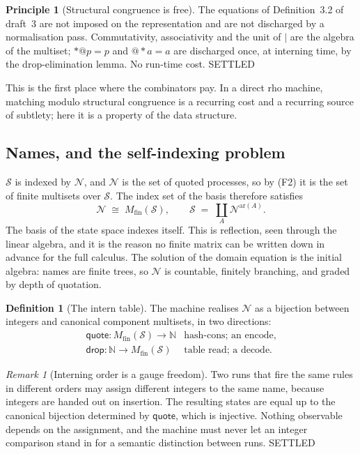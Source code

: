 \documentclass[11pt,a4paper]{article}
\makeatletter
\theoremstyle{plain}
\theoremstyle{definition}
\newtheorem{definition}[theorem]{Definition}
\newtheorem{principle}[theorem]{Principle}
\theoremstyle{remark}
\newtheorem{remark}[theorem]{Remark}
\newcommand{\rhoc}{\textsf{rho}}
\newcommand{\quo}[1]{@#1}
\newcommand{\drp}[1]{{*}#1}
\newcommand{\Spec}{\mathcal{S}}
\newcommand{\Nm}{\mathcal{N}}
\makeatother
\begin{document}
\begin{principle}[Structural congruence is free]
\label{prin:free}
The equations of Definition~3.2 of draft~3 are not imposed on the
representation and are not discharged by a normalisation pass. Commutativity,
associativity and the unit of $\mid$ are the algebra of the multiset;
$\drp{\quo{p}} = p$ and $\quo{\drp{a}} = a$ are discharged once, at
interning time, by the drop-elimination lemma. No run-time cost. \textsf{SETTLED}
\end{principle}

This is the first place where the combinators pay. In a direct \rhoc{}
machine, matching modulo structural congruence is a recurring cost and a
recurring source of subtlety; here it is a property of the data structure.

\subsection{Names, and the self-indexing problem}

$\Spec$ is indexed by $\Nm$, and $\Nm$ is the set of quoted processes, so by
(F2) it is the set of finite multisets over $\Spec$. The index set of the
basis therefore satisfies
\[
  \Nm \;\cong\; M_{\mathrm{fin}}(\Spec), \qquad
  \Spec \;=\; \textstyle\coprod_{A} \Nm^{\mathrm{ar}(A)} .
\]
The basis of the state space indexes itself. This is reflection, seen through
the linear algebra, and it is the reason no finite matrix can be written down
in advance for the full calculus. The solution of the domain equation is the
initial algebra: names are finite trees, so $\Nm$ is countable, finitely
branching, and graded by depth of quotation.

\begin{definition}[The intern table]
\label{def:intern}
The machine realises $\Nm$ as a bijection between integers and canonical
component multisets, in two directions:
\[
\begin{array}{ll}
  \mathsf{quote} : M_{\mathrm{fin}}(\Spec) \to \mathbb{N}
    & \text{hash-cons; an encode,}\\[2pt]
  \mathsf{drop} : \mathbb{N} \to M_{\mathrm{fin}}(\Spec)
    & \text{table read; a decode.}
\end{array}
\]
\end{definition}

\begin{remark}[Interning order is a gauge freedom]
\label{rem:gauge}
Two runs that fire the same rules in different orders may assign different
integers to the same name, because integers are handed out on insertion. The
resulting states are equal up to the canonical bijection determined by
$\mathsf{quote}$, which is injective. Nothing observable depends on the
assignment, and the machine must never let an integer comparison stand in for
a semantic distinction between runs. \textsf{SETTLED}
\end{remark}
\end{document}
